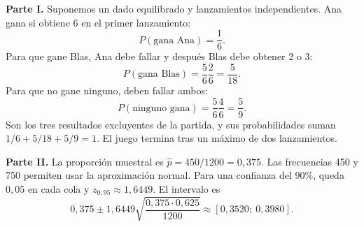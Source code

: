 \textbf{Parte I.} Suponemos un dado equilibrado y lanzamientos independientes. Ana gana si obtiene 6 en el primer lanzamiento:
\[
 P(\text{gana Ana})=\boxed{\frac16}.
\]
Para que gane Blas, Ana debe fallar y después Blas debe obtener 2 o 3:
\[
 P(\text{gana Blas})=\frac56\frac26=\boxed{\frac5{18}}.
\]
Para que no gane ninguno, deben fallar ambos:
\[
 P(\text{ninguno gana})=\frac56\frac46=\boxed{\frac59}.
\]
Son los tres resultados excluyentes de la partida, y sus probabilidades suman $1/6+5/18+5/9=1$. El juego termina tras un máximo de dos lanzamientos.

\textbf{Parte II.} La proporción muestral es $\hat p=450/1200=0{,}375$. Las frecuencias 450 y 750 permiten usar la aproximación normal. Para una confianza del $90\%$, queda $0{,}05$ en cada cola y $z_{0{,}95}\approx1{,}6449$. El intervalo es
\[
 0{,}375\pm1{,}6449\sqrt{\frac{0{,}375\cdot0{,}625}{1200}}
 \approx\boxed{[0{,}3520;\ 0{,}3980]}.
\]
